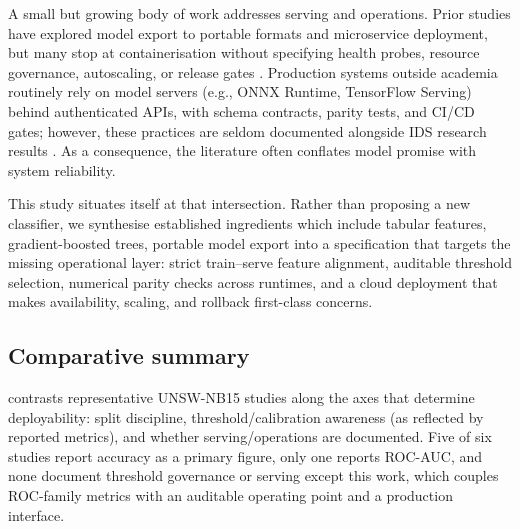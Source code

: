 \documentclass{article}
\begin{document}
A small but growing body of work addresses serving and operations. Prior studies have explored model export to portable formats and microservice deployment, but many stop at containerisation without specifying health probes, resource governance, autoscaling, or release gates \cite{catillo2025}. Production systems outside academia routinely rely on model servers (e.g., ONNX Runtime, TensorFlow Serving) behind authenticated APIs, with schema contracts, parity tests, and CI/CD gates; however, these practices are seldom documented alongside IDS research results \cite{srivastav2022}. As a consequence, the literature often conflates model promise with system reliability.

This study situates itself at that intersection. Rather than proposing a new classifier, we synthesise established ingredients which include tabular features, gradient-boosted trees, portable model export into a specification that targets the missing operational layer: strict train–serve feature alignment, auditable threshold selection, numerical parity checks across runtimes, and a cloud deployment that makes availability, scaling, and rollback first-class concerns.

\subsection*{Comparative summary}
 contrasts representative UNSW-NB15 studies along the axes that determine deployability: split discipline, threshold/calibration awareness (as reflected by reported metrics), and whether serving/operations are documented. Five of six studies report accuracy as a primary figure, only one reports ROC-AUC, and none document threshold governance or serving except this work, which couples ROC-family metrics with an auditable operating point and a production interface.
\end{document}
